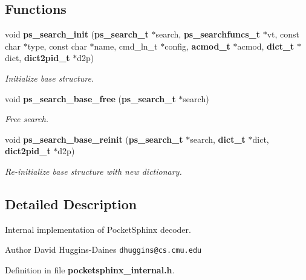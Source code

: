 \subsection*{Functions}
\begin{DoxyCompactItemize}
\item 
void {\bf ps\-\_\-search\-\_\-init} ({\bf ps\-\_\-search\-\_\-t} $\ast$search, {\bf ps\-\_\-searchfuncs\-\_\-t} $\ast$vt, const char $\ast$type, const char $\ast$name, cmd\-\_\-ln\-\_\-t $\ast$config, {\bf acmod\-\_\-t} $\ast$acmod, {\bf dict\-\_\-t} $\ast$dict, {\bf dict2pid\-\_\-t} $\ast$d2p)\label{pocketsphinx__internal_8h_a9e0d66662ea7c64f8bddbbfe57496896}

\begin{DoxyCompactList}\small\item\em Initialize base structure. \end{DoxyCompactList}\item 
void {\bf ps\-\_\-search\-\_\-base\-\_\-free} ({\bf ps\-\_\-search\-\_\-t} $\ast$search)\label{pocketsphinx__internal_8h_a39db3228c813a2943d47ff3f13e6ef08}

\begin{DoxyCompactList}\small\item\em Free search. \end{DoxyCompactList}\item 
void {\bf ps\-\_\-search\-\_\-base\-\_\-reinit} ({\bf ps\-\_\-search\-\_\-t} $\ast$search, {\bf dict\-\_\-t} $\ast$dict, {\bf dict2pid\-\_\-t} $\ast$d2p)\label{pocketsphinx__internal_8h_a307801961f27bd5f4b82a3e6b83e0ca1}

\begin{DoxyCompactList}\small\item\em Re-\/initialize base structure with new dictionary. \end{DoxyCompactList}\end{DoxyCompactItemize}


\subsection{Detailed Description}
Internal implementation of Pocket\-Sphinx decoder. \begin{DoxyAuthor}{Author}
David Huggins-\/\-Daines {\tt dhuggins@cs.\-cmu.\-edu} 
\end{DoxyAuthor}


Definition in file {\bf pocketsphinx\-\_\-internal.\-h}.


